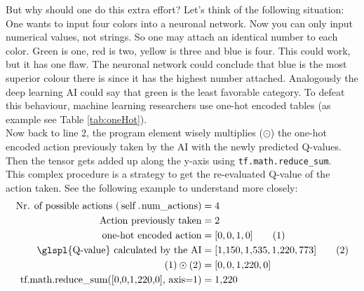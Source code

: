 \documentclass[12pt]{article}
\begin{document}
But why should one do this extra effort? Let's think of the following situation: One wants to  \gls{input} four colors into a \gls{neuronal network}. Now you can only  \gls{input} numerical values, not strings. So one may attach an identical number to each color. Green is one, red is two, yellow is three and blue is four. This could work, but it has one flaw. The \gls{neuronal network} could conclude that blue is the most superior colour there is since it has the highest number attached. Analogously the \gls{deep learning} \gls{AI} could say that green is the least favorable category. To defeat this behaviour, \gls{machine learning} researchers use one-hot encoded tables (as example see Table \ref{tab:oneHot}). \\
Now back to line 2, the program element wisely multiplies ($\odot$) the one-hot encoded action previously taken by the \gls{AI} with the newly predicted \glspl{Q-value}. Then the \gls{tensor} gets added up along the y-axis using \lstinline{tf.math.reduce_sum}. \cite{tf.math.reduce} \\
This complex procedure is a strategy to get the re-evaluated \gls{Q-value} of the action taken. See the following example to understand more closely:
\begin{align}
    \text{Nr. of possible actions (\lstinline{self.num_actions})} &= 4 \notag\\    
    \text{Action previously taken} &= 2 \notag\\
    \text{one-hot encoded action} &= [0,0,1,0] \tag{1}\\
    \text{\glspl{Q-value} calculated by the AI} &= [1\textsc{\char13}150, 1\textsc{\char13}535, 1\textsc{\char13}220, 773] \tag{2}\\
    (1)\odot(2) &= [0,0,1\textsc{\char13}220,0] \notag\\
    \text{tf.math.reduce\_sum([0,0,1\textsc{\char13}220,0], axis=1)} &= 1\textsc{\char13}220\notag
\end{align}
\end{document}
